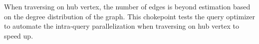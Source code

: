 
When traversing on hub vertex, the number of edges is beyond estimation based on
the degree distribution of the graph. This chokepoint tests the query optimizer
to automate the intra-query parallelization when traversing on hub vertex to
speed up.



